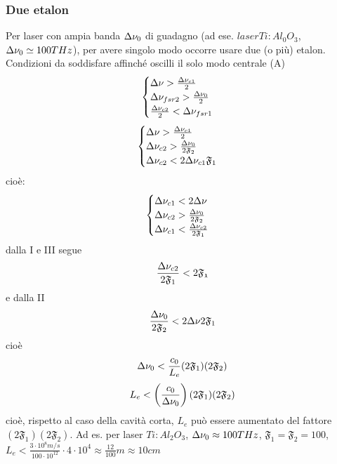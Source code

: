 \subsubsection{Due etalon}
Per laser con ampia banda $\Delta\nu_0$ di guadagno (ad ese. $laser Ti:Al_0O_3$, $\Delta\nu_0 \simeq 100 THz$), per avere singolo modo occorre usare due (o più) etalon.
Condizioni da soddisfare affinché oscilli il solo modo centrale (A)
\begin{equation*}
\begin{cases}
\Delta\nu > \frac{\Delta\nu_{c1}}{2}\\
\Delta\nu_{fsr2} > \frac{\Delta \nu_0}{2}\\
\frac{\Delta \nu_{c2}}{2} < \Delta \nu_{fsr1}
\end{cases}
\end{equation*}
\begin{equation*}
\begin{cases}
\Delta\nu > \frac{\Delta\nu_{c1}}{2}\\
\Delta\nu_{c2} > \frac{\Delta \nu_0}{2\mathfrak{F}_2}\\
\Delta \nu_{c2} < 2\Delta \nu_{c1} \mathfrak{F}_1
\end{cases}
\end{equation*}
cioè:
\begin{equation*}
\begin{cases}
\Delta\nu_{c1} < 2\Delta\nu\\
\Delta\nu_{c2} > \frac{\Delta \nu_0}{2\mathfrak{F}_2}\\
\Delta \nu_{c1} < \frac{\Delta \nu_{c2}}{2\mathfrak{F}_1}
\end{cases}
\end{equation*}
dalla I e III segue
\begin{equation*}
\frac{\Delta\nu_{c2}}{2\mathfrak{F}_1} < 2\mathfrak{F_1}
\end{equation*}
e dalla II
\begin{equation*}
\frac{\Delta \nu_0}{2\mathfrak{F}_2} < 2 \Delta \nu 2 \mathfrak{F}_1
\end{equation*}
cioè
\begin{equation*}
\Delta \nu_0 < \frac{c_0}{L_e} (2\mathfrak{F}_1)(2\mathfrak{F}_2)
\end{equation*}
\begin{equation*}
L_e < \left(\frac{c_0}{\Delta\nu_0}\right) (2\mathfrak{F}_1)(2\mathfrak{F}_2)
\end{equation*}
cioè, rispetto al caso della cavità corta, $L_e$ può essere aumentato del fattore $(2\mathfrak{F}_1)(2\mathfrak{F}_2)$. Ad es. per laser $Ti:Al_2O_3$,
$\Delta\nu_0 \approx 100THz$, $\mathfrak{F}_1 = \mathfrak{F}_2 = 100$, $L_e < \frac{3\cdot 10^8 m/s}{100\cdot10^{12}} \cdot 4\cdot10^4 \approx \frac{12}{100}m \approx 10 cm$

